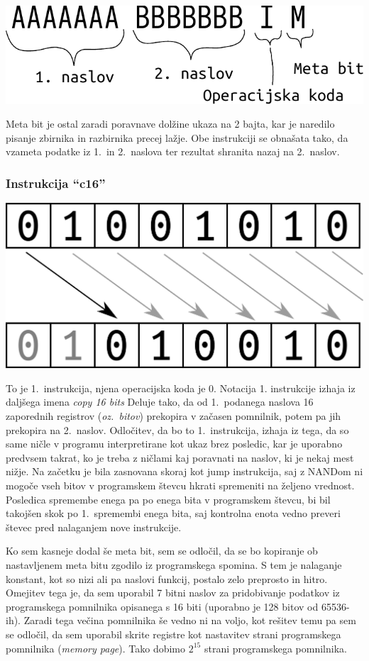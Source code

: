 \documentclass[12pt]{article}
\begin{document}
\begin{center}
  \includegraphics[width=.5\linewidth]{slike/instrukcija.pdf}
\end{center}

Meta bit je ostal zaradi poravnave dolžine ukaza na 2 bajta, kar je naredilo pisanje zbirnika in razbirnika precej lažje.
Obe instrukciji se obnašata tako, da vzameta podatke iz 1.\ in 2.\ naslova ter rezultat shranita nazaj na 2.\ naslov.
\pagebreak
\subsubsection{Instrukcija ``c16''}

\begin{center}
  \includegraphics[width=.3\linewidth]{slike/predstavitev/copy.png}
\end{center}

To je 1.\ instrukcija, njena operacijska koda je $0$.
Notacija 1. instrukcije izhaja iz daljšega imena \textit{copy 16 bits}
Deluje tako, da od 1.\ podanega naslova 16 zaporednih registrov (\textit{oz.\ bitov}) prekopira v začasen pomnilnik, potem pa jih prekopira na 2.\ naslov.
Odločitev, da bo to 1.\ instrukcija, izhaja iz tega, da so same ničle v programu interpretirane kot ukaz brez posledic, kar je uporabno predvsem takrat, ko je treba z ničlami kaj poravnati na naslov, ki je nekaj mest nižje.
Na začetku je bila zasnovana skoraj kot jump instrukcija, saj z NANDom ni mogoče vseh bitov v programskem števcu hkrati spremeniti na željeno vrednost.
Posledica spremembe enega pa po enega bita v programskem števcu, bi bil takojšen skok po 1.\ spremembi enega bita, saj kontrolna enota vedno preveri števec pred nalaganjem nove instrukcije.

Ko sem kasneje dodal še meta bit, sem se odločil, da se bo kopiranje ob nastavljenem meta bitu zgodilo iz programskega spomina.
S tem je nalaganje konstant, kot so nizi ali pa naslovi funkcij, postalo zelo preprosto in hitro.
Omejitev tega je, da sem uporabil 7 bitni naslov za pridobivanje podatkov iz programskega pomnilnika opisanega s 16 biti (uporabno je 128 bitov od 65536-ih).
Zaradi tega večina pomnilnika še vedno ni na voljo, kot rešitev temu pa sem se odločil, da sem uporabil skrite registre kot nastavitev strani programskega pomnilnika (\textit{memory page}).
Tako dobimo $2^{15}$ strani programskega pomnilnika.
\end{document}
